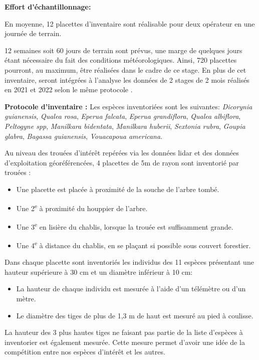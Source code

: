 \documentclass[
  12pt,
  american,
  a4paper,
  extrafontsizes,onecolumn,openright
  ]{memoir}
\begin{document}
\textbf{Effort d'échantillonnage:}

En moyenne, 12 placettes d'inventaire sont réalisable pour deux opérateur en une journée de terrain.

12 semaines soit 60 jours de terrain sont prévus, une marge de quelques jours étant nécessaire du fait des conditions météorologiques. Ainsi, 720 placettes pourront, au maximum, être réalisées dans le cadre de ce stage. En plus de cet inventaire, seront intégrées à l'analyse les données de 2 stages de 2 mois réalisés en 2021 \autocite{Pierre-Justin2021} et 2022 \autocite{Van2022} selon le même protocole .

\textbf{Protocole d'inventaire :}
Les espèces inventoriées sont les suivantes: \emph{Dicorynia guianensis}, \emph{Qualea rosa}, \emph{Eperua falcata}, \emph{Eperua grandiflora}, \emph{Qualea albiflora}, \emph{Peltogyne spp}, \emph{Manilkara bidentata}, \emph{Manilkara huberii}, \emph{Sextonia rubra}, \emph{Goupia glabra}, \emph{Bagassa guianensis}, \emph{Vouacapoua americana}.

Au niveau des trouées d'intérêt repérées via les données lidar et des données d'exploitation géoréférencées, 4 placettes de 5m de rayon sont inventorié par trouées :

\begin{itemize}
\item
  Une placette est placée à proximité de la souche de l'arbre tombé.
\item
  Une 2\textsuperscript{e} à proximité du houppier de l'arbre.
\item
  Une 3\textsuperscript{e} en lisière du chablis, lorsque la trouée est suffisamment grande.
\item
  Une 4\textsuperscript{e} à distance du chablis, en se plaçant si possible sous couvert forestier.
\end{itemize}

Dans chaque placette sont inventoriés les individus des 11 espèces présentant une hauteur supérieure à 30 cm et un diamètre inférieur à 10 cm:

\begin{itemize}
\item
  La hauteur de chaque individu est mesurée à l'aide d'un télémètre ou d'un mètre.
\item
  Le diamètre des tiges de plus de 1,3 m de haut est mesuré au pied à coulisse.
\end{itemize}

La hauteur des 3 plus hautes tiges ne faisant pas partie de la liste d'espèces à inventorier est également mesurée. Cette mesure permet d'avoir une idée de la compétition entre nos espèces d'intérêt et les autres.
\end{document}

